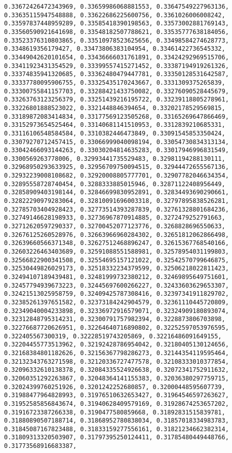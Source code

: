 \documentclass[11pt]{article}
\begin{document}
\begin{Verbatim}[commandchars=\\\{\}]
0.33672426472343969, 0.33659986068881553, 0.33647549227963136, 0.33635115947548888, 0.33622686225600756, 0.3361026006008242, 0.33597837448959289, 0.33585418390198563, 0.33573002881769143, 0.33560590921641698, 0.33548182507788621, 0.33535777638184056, 0.33523376310803865, 0.33510978523625656, 0.33498584274628773, 0.3348619356179427, 0.33473806383104954, 0.33461422736545332, 0.33449042620101654, 0.33436666031761891, 0.33424292969515706, 0.33411923431354529, 0.33399557415271452, 0.33387194919261326, 0.33374835941320685, 0.33362480479447781, 0.33350128531642587, 0.33337780095906755, 0.33325435170243667, 0.3331309375265839, 0.33300755841157703, 0.33288421433750082, 0.33276090528445679, 0.33263763123256379, 0.33251439216195722, 0.33239118805278961, 0.33226801888523022, 0.3321448846394654, 0.33202178529569815, 0.33189872083414834, 0.33177569123505268, 0.33165269647866469, 0.33152973654525464, 0.33140681141510953, 0.3312839210685331, 0.33116106548584584, 0.3310382446473849, 0.33091545853350424, 0.33079270712457415, 0.33066999040098194, 0.33054730834313134, 0.33042466093144263, 0.33030204814635283, 0.33017946996831549, 0.3300569263778006, 0.32993441735529483, 0.32981194288130111, 0.32968950293633925, 0.32956709750094515, 0.32944472655567136, 0.32932239008108682, 0.32920008805777701, 0.32907782046634354, 0.32895558728740454, 0.3288333885015946, 0.32871122408956449, 0.32858909403198144, 0.32846699830952891, 0.32834493690290661, 0.32822290979283064, 0.32810091696003318, 0.32797895838526281, 0.32785703404928423, 0.32773514393287839, 0.32761328801684236, 0.32749146628198933, 0.32736967870914885, 0.3272479252791663, 0.32712620597290337, 0.32700452077123776, 0.3268828696550633, 0.32676125260528976, 0.32663966960284302, 0.32651812062866498, 0.32639660566371348, 0.32627512468896247, 0.32615367768540166, 0.32603226463403689, 0.32591088551588981, 0.32578954031199803, 0.32566822900341508, 0.32554695157121022, 0.32542570799646875, 0.32530449826029173, 0.32518332234379599, 0.32506218022811423, 0.32494107189439481, 0.32481999732380212, 0.32469895649751601, 0.32457794939673223, 0.32445697600266227, 0.32433603629653307, 0.32421513025958759, 0.32409425787308416, 0.32397341911829702, 0.32385261397651582, 0.32373184242904579, 0.32361110445720809, 0.32349040004233898, 0.32336972916579071, 0.32324909180893074, 0.32312848795314231, 0.32300791757982394, 0.3228873806703898, 0.32276687720626951, 0.32264640716890802, 0.32252597053976595, 0.322405567300319, 0.32228519743205869, 0.32216486091649155, 0.32204455773513962, 0.32192428786954042, 0.32180405130124656, 0.32168384801182626, 0.32156367798286273, 0.32144354119595464, 0.32132343763271598, 0.32120336727477578, 0.32108333010377854, 0.32096332610138378, 0.32084335524926638, 0.32072341752911632, 0.32060351292263867, 0.32048364141155383, 0.32036380297759715, 0.32024399760251926, 0.3201242252680857, 0.32000448595607739, 0.31988477964828993, 0.31976510632653427, 0.31964546597263627, 0.31952585856843674, 0.31940628409579169, 0.31928674253657202, 0.31916723387266338, 0.3190477580859668, 0.31892831515839781, 0.31880890507188714, 0.31868952780838034, 0.31857018334983783, 0.31845087167823488, 0.31833159277556161, 0.31821234662382314, 0.31809313320503907, 0.31797395250124411, 0.31785480449448766, 0.31773568916683387, 
\end{Verbatim}
\end{document}
